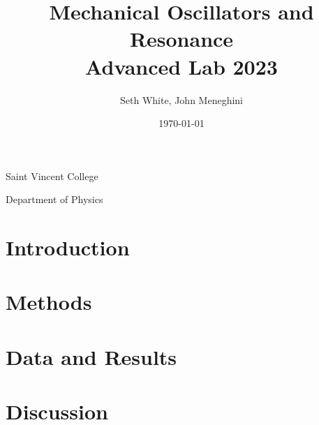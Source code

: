 \documentclass[12pt, letterpaper]{article}
\title{Mechanical Oscillators and Resonance \\
    \large Advanced Lab 2023}
\author{Seth White, John Meneghini}
\date{\today}
\begin{document}
    \maketitle

\centerline{\large Saint Vincent College}
\centerline{Department of Physics}

    \begin{abstract}
        
    \end{abstract}
\newpage
	
    \section*{Introduction}
    




    \section*{Methods}
    

	\newpage
    \section*{Data and Results}
    

	\newpage
    \section*{Discussion}
    

    \newpage
    
\end{document}
